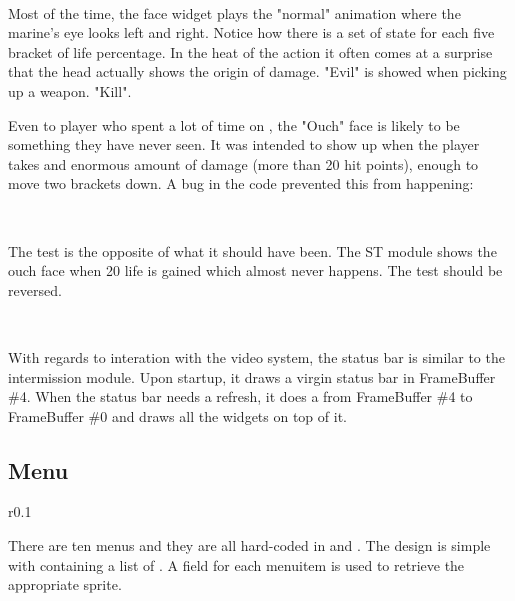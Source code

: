 \par
{}\\
\par
Most of the time, the face widget plays the "normal" animation where the marine's eye looks left and right. Notice how there is a set of state for each five bracket of life percentage. In the heat of the action it often comes at a surprise that the head actually shows the origin of damage. "Evil" is showed when picking up a weapon. "Kill".\\
\par
Even to player who spent a lot of time on \doom, the "Ouch" face is likely to be something they have never seen. It was intended to show up when the player takes and enormous amount of damage (more than 20 hit points), enough to move two brackets down. A bug in the code prevented this from happening:\\
\par
{}\\
\par
The test is the opposite of what it should have been. The ST module shows the ouch face when 20 life is gained which almost never happens. The test should be reversed.\\
\par
{}\\
\par
With regards to interation with the video system, the status bar is similar to the intermission module. Upon startup, it draws a virgin status bar in FrameBuffer \#4. When the status bar needs a refresh, it does a  from FrameBuffer \#4 to FrameBuffer \#0 and draws all the widgets on top of it.\\
\par
{}


\subsection{Menu}

\begin{wrapfigure}[5]{r}{0.1\textwidth}
\centering
{}
\end{wrapfigure}
There are ten menus and they are all hard-coded in  and . The design is simple with  containing a list of . A  field for each menuitem is used to retrieve the appropriate sprite.\\
\par

